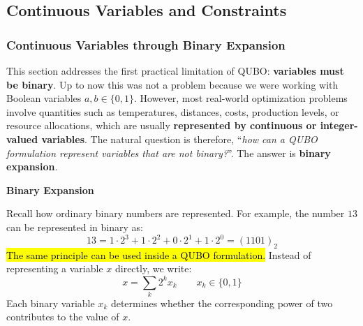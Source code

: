 \subsection{Continuous Variables and Constraints}\label{sec:continuous-variables-and-constraints}

\subsubsection{Continuous Variables through Binary Expansion}\label{sec:continuous-variables-through-binary-expansion}

This section addresses the first practical limitation of QUBO: \textbf{variables must be binary}. Up to now this was not a problem because we were working with Boolean variables $a,b \in \{0,1\}$. However, most real-world optimization problems involve quantities such as temperatures, distances, costs, production levels, or resource allocations, which are usually \textbf{represented by continuous or integer-valued variables}. The natural question is therefore, ``\emph{how can a QUBO formulation represent variables that are not binary?}''. The answer is \textbf{binary expansion}.

\highspace
\begin{flushleft}
    \textcolor{Green3}{ \textbf{Binary Expansion}}
\end{flushleft}
Recall how ordinary binary numbers are represented. For example, the number $13$ can be represented in binary as:
\begin{equation*}
    13 = 1 \cdot 2^3 + 1 \cdot 2^2 + 0 \cdot 2^1 + 1 \cdot 2^0 = \left(1101\right)_{2}
\end{equation*}
\hl{The same principle can be used inside a QUBO formulation.} Instead of representing a variable $x$ directly, we write:
\begin{equation}\label{eq:binary-expansion}
    x =\sum_{k} 2^k x_k \qquad x_{k} \in \{0,1\}
\end{equation}
Each binary variable $x_k$ determines whether the corresponding power of two contributes to the value of $x$.

